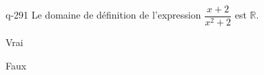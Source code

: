 \begin{truefalse}{q-291}
Le domaine de définition de l'expression $\dfrac{x+2}{x^2+2}$ est $\mathbb R$.
\item* Vrai
\item Faux
\end{truefalse}

